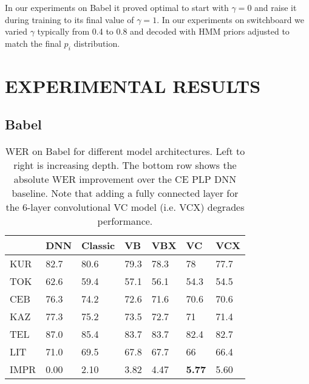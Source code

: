 \documentclass{article}
\begin{document}
In our experiments on Babel it proved optimal to start with $\gamma=0$ and raise
it during training to its final value of $\gamma=1$.
In our experiments on switchboard we varied $\gamma$ typically from 0.4 to 0.8
and decoded with HMM priors adjusted to match the final $p_i$ distribution.

\section{EXPERIMENTAL RESULTS}

\subsection{Babel}
\label{ssec:babel}

\begin{table}[ht]
\centering
\begin{tabular}{l | l | lllll}
         & DNN     & Classic & VB   & VBX  & VC   & VCX  \\ \hline
KUR      & 82.7 & 80.6    & 79.3 & 78.3 & 78   & 77.7 \\
TOK      & 62.6 & 59.4    & 57.1 & 56.1 & 54.3 & 54.5 \\
CEB      & 76.3 & 74.2    & 72.6 & 71.6 & 70.6 & 70.6 \\
KAZ      & 77.3 & 75.2    & 73.5 & 72.7 & 71   & 71.4 \\
TEL      & 87.0 & 85.4    & 83.7 & 83.7 & 82.4 & 82.7 \\
LIT      & 71.0 & 69.5    & 67.8 & 67.7 & 66   & 66.4 \\ \hline
IMPR     & 0.00 & 2.10    & 3.82 & 4.47 & \bf{5.77} & 5.60
\end{tabular}
\caption{\label{tab:depth}WER on Babel for different model architectures. Left to right is increasing depth. 
    The bottom row shows the absolute WER improvement over the CE PLP DNN baseline.
    Note that adding a fully connected layer for the 6-layer convolutional VC model (i.e. VCX) degrades performance.
}
\end{table}
\end{document}
